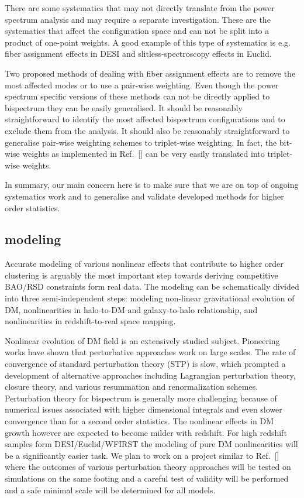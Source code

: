 There are some systematics that may not directly translate from the power
spectrum analysis and may require a separate investigation. These are the
systematics that affect the configuration space and can not be split into a
product of one-point weights. A good example of this type of systematics is
e.g. fiber assignment effects in DESI and slitless-spectroscopy effects in
Euclid.

Two proposed methods of dealing with fiber assignment effects are to remove the
most affected modes or to use a pair-wise weighting. Even though the power
spectrum specific versions of these methods can not be directly applied to
bispectrum they can be easily generalised. It should be reasonably
straightforward to identify the most affected bispectrum configurations and to
exclude them from the analysis. It should also be reasonably straightforward
to generalise pair-wise weighting schemes to triplet-wise weighting. In fact,
the bit-wise weights as implemented in Ref.~[] can be very easily translated
into triplet-wise weights.

In summary, our main concern here is to make sure that we are on top of ongoing
systematics work and to generalise and validate developed methods for higher
order statistics.

\subsection*{modeling}

Accurate modeling of various nonlinear effects that contribute to higher order
clustering is arguably the most important step towards deriving competitive
BAO/RSD constraints form real data. The modeling can be schematically divided
into three semi-independent steps: modeling non-linear gravitational evolution
of DM, nonlinearities in halo-to-DM and galaxy-to-halo relationship, and
nonlinearities in redshift-to-real space mapping.

Nonlinear evolution of DM field is an extensively studied subject. Pioneering
works have shown that perturbative approaches work on large scales. The rate of
convergence of standard perturbation theory (STP) is slow, which prompted a
development of alternative approaches including Lagrangian perturbation theory,
closure theory, and various resummation and renormalization schemes.
Perturbation theory for bispectrum is generally more challenging because of
numerical issues associated with higher dimensional integrals and even slower
convergence than for a second order statistics. The nonlinear effects in DM
growth however are expected to become milder with redshift. For high redshift
samples form DESI/Euclid/WFIRST the modeling of pure DM nonlinearities will be
a significantly easier task. We plan to work on a project similar to Ref.~[]
where the outcomes of various perturbation theory approaches will be tested on
simulations on the same footing and a careful test of validity will be
performed and a safe minimal scale will be determined for all models.

